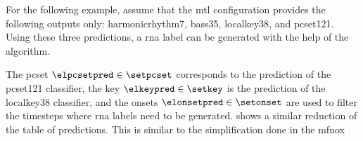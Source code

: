
For the following example, assume that the \gls{mtl}
configuration provides the following outputs only:
\gls{harmonicrhythm7}, \gls{bass35},  \gls{localkey38}, and
\gls{pcset121}. Using these three predictions, a \gls{rna}
label can be generated with the help of the \algorithmrn{}
algorithm.

The \gls{pcset} $\elpcsetpred \in \setpcset$ corresponds to
the prediction of the \gls{pcset121} classifier, the key
$\elkeypred \in \setkey$ is the prediction of the
\gls{localkey38} classifier, and the onsets $\elonsetpred
\in \setonset$ are used to filter the timesteps where
\gls{rna} labels need to be generated.
 shows a similar reduction
of the table of predictions. This is similar to the
simplification done in the mfnox
